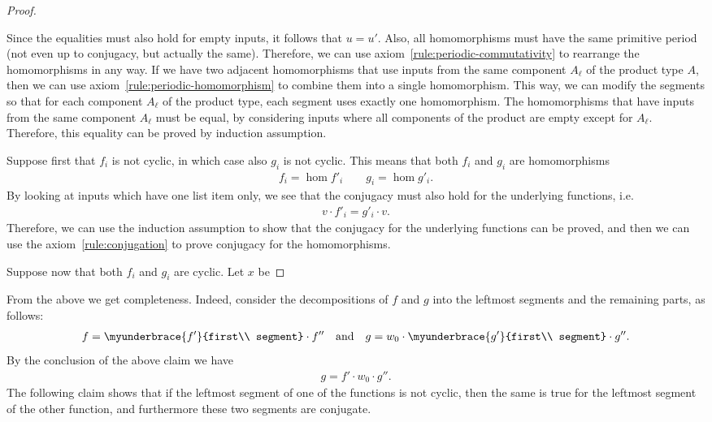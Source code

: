 \begin{proof}
\begin{enumerate}[(a)]
    Since the equalities must also hold for empty inputs, it follows that $u = u'$. Also, all homomorphisms must have the same primitive period (not even up to conjugacy, but actually the same). Therefore, we can use axiom~\eqref{rule:periodic-commutativity} to rearrange the homomorphisms in any way. If we have two adjacent homomorphisms that use inputs from the same component $A_\ell$ of the product type $A$, then we can use axiom~\eqref{rule:periodic-homomorphism} to combine them into a single homomorphism. This way, we can modify the segments so that  for each component $A_\ell$ of the product type, each segment uses exactly one homomorphism. The homomorphisms that have inputs from the same component $A_\ell$ must be equal, by considering inputs where all components of the product are empty except for $A_\ell$. Therefore, this equality can be proved by induction assumption. 
    \end{enumerate}
    Suppose first that $f_i$ is not cyclic, in which case also $g_i$ is not cyclic. This means that both $f_i$ and $g_i$ are homomorphisms
    \begin{align*}
    f_i = \hom f'_i \qquad g_i = \hom g'_i.
    \end{align*}
    By looking at inputs which have one list item only, we see that  the conjugacy must also hold for the underlying functions, i.e.
    \begin{align*}v \cdot f'_i = g'_i \cdot v.
    \end{align*}
    Therefore, we can use the induction assumption to show that the conjugacy for the underlying functions can be proved, and then we can use the axiom~\eqref{rule:conjugation} to prove conjugacy for the homomorphisms.
    
    Suppose now that both $f_i$ and $g_i$ are cyclic. Let $x$ be 
 \end{proof}
From the above we get completeness. Indeed, consider the decompositions of $f$ and $g$ into the leftmost segments and the remaining parts, as follows:
\begin{align*}
f = \myunderbrace{f'}{first\\ segment} \cdot f''  \quad \text{and} \quad g = w_0 \cdot \myunderbrace{g'}{first\\ segment} \cdot g''.
\end{align*}
By the conclusion of the above claim we have 
\begin{align*}
g = f' \cdot w_0 \cdot g''.
\end{align*}
The following claim shows that if the leftmost segment of one of the functions is not cyclic, then the same is true for the leftmost segment of the other function, and furthermore these two segments are conjugate.

